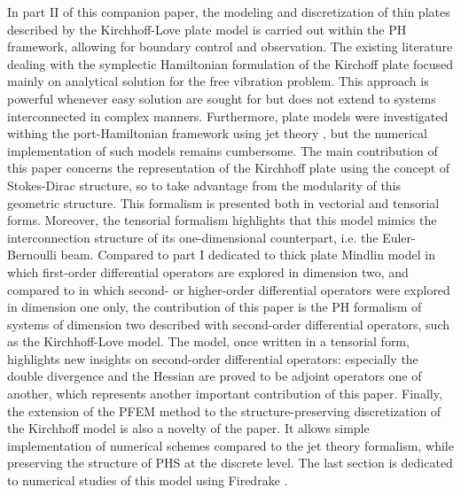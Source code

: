 \documentclass[preprint,12pt]{elsarticle}
\begin{document}
In part II of this companion paper, the modeling and discretization of thin plates described by the Kirchhoff-Love plate model is carried out within the PH framework, allowing for boundary control and observation. {The existing literature dealing with the symplectic Hamiltonian formulation of the Kirchoff plate \cite{LI2016984,LI2018310} focused mainly on analytical solution for the free vibration problem. This approach is powerful whenever easy solution are sought for but does not extend to systems interconnected in complex manners.} Furthermore, plate models were investigated withing the port-Hamiltonian framework using jet theory  {\cite{jetMin,jetKirchh}}, but the numerical implementation of such models remains cumbersome. The main contribution of this paper concerns the representation of the Kirchhoff plate using the concept of Stokes-Dirac structure, so to take advantage from the modularity of this geometric structure. This formalism is presented both in vectorial and tensorial forms.  Moreover, the tensorial formalism \cite[Chapter~16]{Grinfield} highlights that this model mimics the interconnection structure of its one-dimensional counterpart, i.e. the Euler-Bernoulli beam. Compared to part I dedicated to thick plate Mindlin model in which first-order differential operators are explored in dimension two, and compared to \cite{LeGorrec2005} in which second-  or higher-order differential operators were explored in dimension one only, the contribution of this paper is the PH formalism of systems of dimension two described with second-order  differential operators, such as the Kirchhoff-Love  model. The model, once written in a tensorial form, highlights new insights on second-order differential operators: especially the double divergence and the Hessian are proved to be adjoint operators one of another, which represents another important contribution of this paper.
Finally, the extension of the PFEM method  to the structure-preserving discretization of the Kirchhoff model  is also a novelty of the paper. It allows simple implementation of numerical schemes compared to the jet theory formalism, while preserving the structure of PHS at the discrete level. {The last section is dedicated to numerical studies of this model using Firedrake \cite{firedrake}.}
\end{document}
